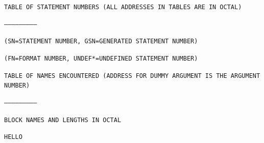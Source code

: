 

\texttt{TABLE OF STATEMENT NUMBERS (ALL ADDRESSES IN TABLES ARE IN OCTAL)}

\texttt{--------------------------}


\texttt{(SN=STATEMENT NUMBER, GSN=GENERATED STATEMENT NUMBER)}

\texttt{(FN=FORMAT NUMBER, UNDEF*=UNDEFINED STATEMENT NUMBER)}

\texttt{TABLE OF NAMES ENCOUNTERED (ADDRESS FOR DUMMY ARGUMENT IS THE ARGUMENT NUMBER)}

\texttt{--------------------------}


\texttt{BLOCK NAMES AND LENGTHS IN OCTAL}


\texttt{HELLO}

